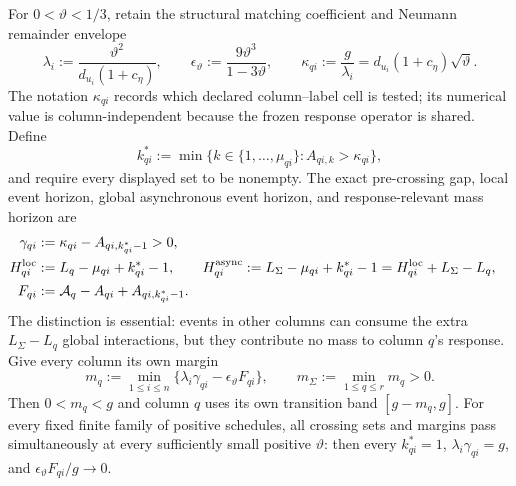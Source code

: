 \begin{theorem}
For $0<\vartheta<1/3$, retain the structural matching coefficient and
Neumann remainder envelope
\begin{equation}
 \lambda_i:=\frac{\vartheta^2}{d_{u_i}(1+c_\eta)},
 \qquad
 \epsilon_\vartheta:=\frac{9\vartheta^3}{1-3\vartheta},
 \qquad
 \kappa_{qi}:=\frac{g}{\lambda_i}
 =d_{u_i}(1+c_\eta)\sqrt\vartheta.
 \label{eq:notched-sun-columnwise-amplitude-capacity}
\end{equation}
The notation $\kappa_{qi}$ records which declared column--label cell is
tested; its numerical value is column-independent because the frozen response
operator is shared.  Define
\begin{equation}
 k_{qi}^*:=
 \min\{k\in\{1,\ldots,\mu_{qi}\}:A_{qi,k}>\kappa_{qi}\},
 \label{eq:notched-sun-columnwise-amplitude-crossing-index}
\end{equation}
and require every displayed set to be nonempty.  The exact pre-crossing gap,
local event horizon, global asynchronous event horizon, and response-relevant
mass horizon are
\begin{align}
 \gamma_{qi}
 &:=\kappa_{qi}-A_{qi,k_{qi}^*-1}>0,
 \label{eq:notched-sun-columnwise-amplitude-gap}\\
 H_{qi}^{\rm loc}
 &:=L_q-\mu_{qi}+k_{qi}^*-1,
 &
 H_{qi}^{\rm async}
 &:=L_\Sigma-\mu_{qi}+k_{qi}^*-1
 =H_{qi}^{\rm loc}+L_\Sigma-L_q,
 \label{eq:notched-sun-columnwise-amplitude-event-horizons}\\
 F_{qi}
 &:=\mathcal A_q-A_{qi}+A_{qi,k_{qi}^*-1}.
 \label{eq:notched-sun-columnwise-amplitude-mass-horizon}
\end{align}
The distinction is essential: events in other columns can consume the extra
$L_\Sigma-L_q$ global interactions, but they contribute no mass to column
$q$'s response.  Give every column its own margin
\begin{equation}
 m_q:=\min_{1\leq i\leq n}
 \{\lambda_i\gamma_{qi}-\epsilon_\vartheta F_{qi}\},
 \qquad
 m_\Sigma:=\min_{1\leq q\leq r}m_q>0.
 \label{eq:notched-sun-columnwise-amplitude-margin}
\end{equation}
Then $0<m_q<g$ and column $q$ uses its own transition band $[g-m_q,g]$.
For every fixed finite family of positive schedules, all crossing sets and
margins pass simultaneously at every sufficiently small positive
$\vartheta$: then every $k_{qi}^*=1$,
$\lambda_i\gamma_{qi}=g$, and
$\epsilon_\vartheta F_{qi}/g\to0$.


\end{theorem}
